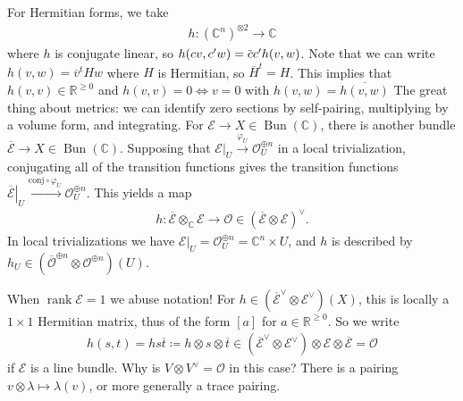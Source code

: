 \begin{remark}

For Hermitian forms, we take
\begin{align*}
h: ({\mathbb{C}}^n)^{\otimes 2}\to {\mathbb{C}}
\end{align*}
where \(h\) is conjugate linear, so
\(h(cv, c'w) = \mkern 1.5mu\overline{\mkern-1.5muc\mkern-1.5mu}\mkern 1.5muc' h(v, w)\).
Note that we can write \(h(v, w) = {\overline{{v}}}^t H w\) where \(H\)
is Hermitian, so \({\overline{{H}}}^t = H\). This implies that
\(h(v,v) \in {\mathbb{R}}^{\geq 0}\) and \(h(v,v) = 0 \iff v=0\) with
\(h(v, w) = {\overline{{h(v, w)}}}\) The great thing about metrics: we
can identify zero sections by self-pairing, multiplying by a volume
form, and integrating. For
\(\mathcal{E}\to X \in \mathop{\mathrm{Bun}}({\mathbb{C}})\), there is
another bundle
\({\overline{{\mathcal{E}}}} \to X \in \mathop{\mathrm{Bun}}({\mathbb{C}})\).
Supposing that
\({ \left.{{ \mathcal{E}}} \right|_{{U}} } \xrightarrow{\varphi_U} {\mathcal{O}}_U^{\oplus n}\)
in a local trivialization, conjugating all of the transition functions
gives the transition functions
\({ \left.{{ {\overline{{ \mathcal{E}}}} }} \right|_{{U}} } \xrightarrow{\mathrm{conj} \circ \varphi_U} {\mathcal{O}}_U^{\oplus n}\).
This yields a map
\begin{align*}
h: {\overline{{ \mathcal{E} }}} \otimes_{\mathbb{C}}\mathcal{E} \to {\mathcal{O}}\in ( {\overline{{\mathcal{E}}}} \otimes\mathcal{E} )^\vee
.\end{align*}
In local trivializations we have
\({ \left.{{ \mathcal{E} }} \right|_{{U}} } = {\mathcal{O}}_U^{\oplus n} = {\mathbb{C}}^n \times U\),
and \(h\) is described by
\(h_U \in ({\overline{{ {\mathcal{O}}}}}^{\oplus n} \otimes{\mathcal{O}}^{\oplus n})(U)\).

\end{remark}

\begin{remark}

When \(\operatorname{rank}\mathcal{E} = 1\) we abuse notation! For
\(h\in ({\overline{{\mathcal{E}}}}^\vee\otimes\mathcal{E}^\vee)(X)\),
this is locally a \(1\times 1\) Hermitian matrix, thus of the form
\([a]\) for \(a\in {\mathbb{R}}^{\geq 0}\). So we write
\begin{align*}
h(s, t) = hs{\overline{{t}}} \coloneqq h\otimes s \otimes{\overline{{t}}} \in ({\overline{{\mathcal{E}}}}^\vee\otimes\mathcal{E}^\vee) \otimes\mathcal{E} \otimes{\overline{{\mathcal{E}}}} = {\mathcal{O}}
\end{align*}
if \(\mathcal{E}\) is a line bundle. Why is
\(V\otimes V^\vee= {\mathcal{O}}\) in this case? There is a pairing
\(v\otimes\lambda \mapsto \lambda(v)\), or more generally a trace
pairing.

\end{remark}


